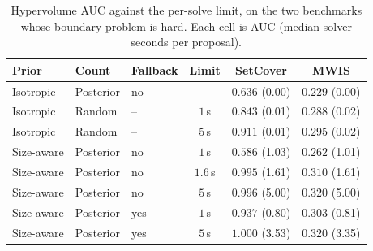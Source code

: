 \begin{table}[t]\centering\small
\caption{Hypervolume AUC against the per-solve limit, on the two benchmarks whose boundary problem is hard. Each cell is AUC (median solver seconds per proposal). }\label{tab:sweep}
\begin{tabular}{lllccc}
\toprule
Prior & Count & Fallback & Limit & SetCover & MWIS \\
\midrule
Isotropic & Posterior & no & -- & $0.636$ (0.00) & $0.229$ (0.00) \\
Isotropic & Random & -- & $1$\,s & $0.843$ (0.01) & $0.288$ (0.02) \\
Isotropic & Random & -- & $5$\,s & $0.911$ (0.01) & $0.295$ (0.02) \\
Size-aware & Posterior & no & $1$\,s & $0.586$ (1.03) & $0.262$ (1.01) \\
Size-aware & Posterior & no & $1.6$\,s & $0.995$ (1.61) & $0.310$ (1.61) \\
Size-aware & Posterior & no & $5$\,s & $0.996$ (5.00) & $0.320$ (5.00) \\
Size-aware & Posterior & yes & $1$\,s & $0.937$ (0.80) & $0.303$ (0.81) \\
Size-aware & Posterior & yes & $5$\,s & $1.000$ (3.53) & $0.320$ (3.35) \\
\bottomrule
\end{tabular}
\end{table}
